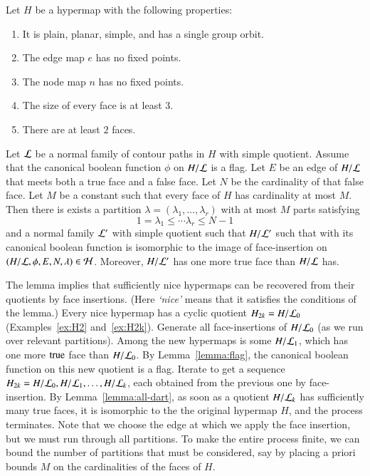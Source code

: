 \begin{theorem}  Let $H$ be a hypermap with the following properties:
    \begin{enumerate}
        \item It is plain, planar, simple, and has a single group orbit.
        \item The edge map $e$ has no fixed points.
        \item The node map $n$ has no fixed points.
        \item The size of every face is at least $3$.
        \item There are at least $2$ faces. 
    \end{enumerate}
Let $\cal L$ be a normal family of contour paths in $H$ with
simple quotient. Assume that
the canonical boolean function $\phi$ on $H/{\cal L}$ is a flag. Let
$E$ be an edge of $H/{\cal L}$ that meets both a true face
and a false face. Let $N$ be the cardinality of that false face. Let
$M$ be a constant such that every face of $H$ has cardinality at
most $M$. Then there is exists a partition $\lambda=(\lambda_1,\ldots,\lambda_r)$ with at most
$M$ parts satisfying $$1=\lambda_1\le \cdots\lambda_r \le N-1$$
and a normal family
${\cal L}'$ with simple quotient such that $H/{\cal L}'$  such that
with its canonical boolean
function is isomorphic to the image of face-insertion on
$(H/{\cal L},\phi,E,N,\lambda)\in {\cal H}$. 
Moreover, $H/{\cal L}'$
has one more true face than $H/{\cal L}$ has.
\end{theorem}

\begin{remark}
\label{remark:nice-algorithm} 
The lemma implies that sufficiently nice hypermaps can be recovered
from their quotients by face insertions.  (Here {\it `nice'} means
that it satisfies the conditions of the lemma.)  
Every nice hypermap has a cyclic quotient 
$H_{2k}=H/{\cal L}_0$
(Examples~\ref{ex:H2} and~\ref{ex:H2k}).
Generate all face-insertions of $H/{\cal L}_0$ 
(as we run over relevant partitions).
Among the new hypermaps is some $H/{\cal L}_1$, which
has one more ${\operatorname{true}}$ face than $H/{\cal L}_0$.  By 
Lemma~\ref{lemma:flag}, 
the canonical boolean function on this new quotient
is a flag.  Iterate to get a sequence
$H_{2k} = H/{\cal L}_0, H/{\cal L}_1,\ldots, H/{\cal L}_k$,
each obtained from the previous one by face-insertion.
By Lemma~\ref{lemma:all-dart}, 
as
soon as a quotient $H/{\cal L}_k$ 
has sufficiently many true faces, it is
isomorphic to the the original hypermap $H$, and the process
terminates.
Note that we choose the edge at which we apply the face
insertion, but we must run through
all partitions.  To make the entire process finite, we can bound the
number of partitions that must be considered, say by placing a
priori bounds $M$ on the cardinalities of the faces of $H$.
\end{remark}

